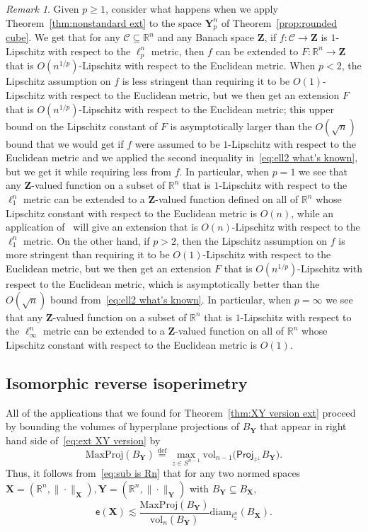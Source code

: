 \documentclass[11pt,reqno]{amsart}
\renewcommand{\ge}{\geqslant}
\newcommand{\diam}{\mathrm{diam}}
\newcommand{\proj}{\mathsf{Proj}}
\newcommand{\X}{\mathbf X}
\newcommand{\Y}{\mathbf Y}
\newcommand{\R}{\mathbb R}
\theoremstyle{remark}
\newtheorem{remark}[theorem]{Remark}
\renewcommand{\subset}{\subseteq}
\newcommand{\eqdef}{\stackrel{\mathrm{def}}{=}}
\newcommand{\ee}{\mathsf{e}}
\newcommand{\bfZ}{\mathbf{Z}}
\newcommand{\sub}{\mathscr{C}}
\newcommand{\vol}{\mathrm{vol}}
\renewcommand{\1}{\mathbf 1}
\begin{document}
\begin{remark} Given $p\ge 1$, consider what happens when we apply Theorem~\ref{thm:nonstandard ext} to the space $\Y_p^n$ of Theorem~\ref{prop:rounded cube}. We get that for any $\sub \subset \R^n$ and any Banach space $\bfZ$, if $f:\sub \to \bfZ$ is $1$-Lipschitz with respect to the $\ell_p^n$ metric, then $f$ can be extended to  $F:\R^n\to \bfZ$ that is $O(n^{1/p})$-Lipschitz with respect to the  Euclidean metric. When $p<2$, the Lipschitz assumption on $f$ is less stringent than requiring it to be $O(1)$-Lipschitz with respect to the Euclidean metric, but we then get an extension $F$ that is $O(n^{1/p})$-Lipschitz with respect to the Euclidean metric; this  upper bound on the Lipschitz constant of $F$ is asymptotically larger than the $O(\sqrt{n})$  bound that we would get if $f$ were assumed to be $1$-Lipschitz with respect to the Euclidean metric and we applied the second inequality in~\eqref{eq:ell2 what's known}, but we get it while requiring less from $f$. In particular, when $p=1$ we see that any $\bfZ$-valued function on a subset of $\R^n$ that is $1$-Lipschitz with respect to the $\ell_1^n$ metric can be extended to a $\bfZ$-valued function defined on all of $\R^n$ whose Lipschitz constant with respect to the Euclidean metric is $O(n)$, while an application of~\cite{JLS86} will give an extension that is $O(n)$-Lipschitz with respect to the $\ell_1^n$ metric. On the other hand, if $p>2$, then the Lipschitz assumption on $f$ is more stringent than requiring it to be $O(1)$-Lipschitz with respect to the Euclidean metric, but we then get an extension $F$ that is $O(n^{1/p})$-Lipschitz with respect to the Euclidean metric, which is asymptotically better than the $O(\sqrt{n})$ bound from~\eqref{eq:ell2 what's known}. In particular, when $p=\infty$ we see that any $\bfZ$-valued function on a subset of $\R^n$ that is $1$-Lipschitz with respect to the $\ell_\infty^n$ metric can be extended to a $\bfZ$-valued function on all of $\R^n$ whose Lipschitz constant with respect to the Euclidean metric is $O(1)$.
\end{remark}


\subsection{Isomorphic reverse isoperimetry}\label{sec:reverse iso} All of the applications that we found for Theorem~\ref{thm:XY version ext} proceed by bounding  the volumes of hyperplane projections of $B_\Y$ that appear in right hand side of~\eqref{eq:ext XY version} by
\begin{equation}\label{eq:max projection display}
\mathrm{MaxProj}(B_\Y)\eqdef \max_{z\in S^{n-1}} \vol_{n-1}\big(\proj_{z^\perp}B_{\Y}\big).
\end{equation}
Thus, it follows from~\eqref{eq:sub is Rn} that for any two normed spaces $\X=(\R^n, \|\cdot\|_\X), \Y=(\R^n,\|\cdot\|_\Y)$ with $B_\Y\subset B_\X$,
\begin{equation}\label{eq:substitute MaxProj}
\ee(\X)\lesssim \frac{\mathrm{MaxProj}(B_\Y)}{\vol_n(B_\Y)}\diam_{\ell_2^n}(B_\X).
\end{equation}
\end{document}
